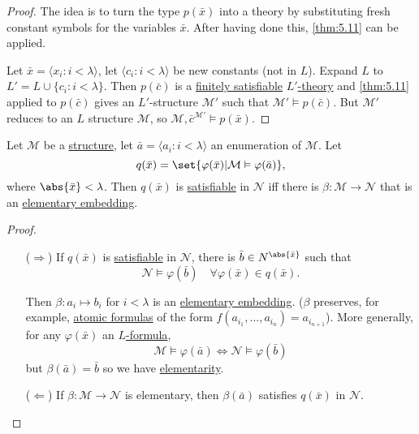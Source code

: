\documentclass{article}
\let\models\vDash
\begin{document}
\begin{proof}
  The idea is to turn the type $p(\bar{x})$ into a theory by substituting fresh constant symbols for the variables $\bar{x}$. After having done this, \cref{thm:5.11} can be applied.
  
  Let $\bar{x} = \langle x_i : i < \lambda \rangle$, let $\langle c_i : i < \lambda \rangle$ be new constants (not in $L$).
  Expand $L$ to $L' = L \cup \{c_i : i < \lambda\}$.
  Then $p(\bar{c})$ is a \hyperlink{def:fs}{finitely satisfiable} \hyperlink{def:ltheory}{$L'$-theory} and \cref{thm:5.11} applied to $p(\bar{c})$ gives an $L'$-structure $\mathcal{M}'$ such that $\mathcal{M}' \models p(\bar{c})$.
  But $\mathcal{M}'$ reduces to an $L$ structure $\mathcal{M}$, so $\mathcal{M}, \bar{c}^{\mathcal{M}'} \models p(\bar{x})$.
\end{proof}
\begin{nlemma}\label{lem:5.14}
  Let $\mathcal{M}$ be a \hyperlink{def:str}{structure}, let $\bar{a} = \langle a_i : i < \lambda \rangle$ an enumeration of $\mathcal{M}$.
  Let
  \begin{equation*}q(\bar{x}) = \set{\varphi(\bar{x}) | \mathcal{M} \models \varphi(\bar{a})},\end{equation*}
  where $\abs{\bar{x}} < \lambda$.
  Then $q(\bar{x})$ is \hyperlink{def:type}{satisfiable} in $\mathcal{N}$ iff there is $\beta: \mathcal{M} \to \mathcal{N}$ that is an \hyperlink{def:el}{elementary embedding}.
\end{nlemma}
\begin{proof}\leavevmode
  \begin{itemize}
    \item[($\Rightarrow$)] If $q(\bar{x})$ is \hyperlink{def:type}{satisfiable} in $\mathcal{N}$, there is $\bar{b} \in N^{\abs{\bar{x}}}$ such that
  \begin{equation*}
    \mathcal{N} \models \varphi(\bar{b}) \quad \forall \varphi(\bar{x}) \in q(\bar{x}).
  \end{equation*}

  Then $\beta: a_i \mapsto b_i$ for $i < \lambda$ is an \hyperlink{def:el}{elementary embedding}.
  ($\beta$ preserves, for example, \hyperlink{def:atomform}{atomic formulas} of the form $f(a_{i_1}, \dotsc, a_{i_n}) = a_{i_{n+1}}$).
  More generally, for any $\varphi(\bar{x})$ an \hyperlink{def:form}{$L$-formula},
  \begin{equation*}
    \mathcal{M} \models \varphi(\bar{a}) \iff \mathcal{N} \models \varphi(\bar{b})
  \end{equation*}
  but $\beta(\bar{a}) = \bar{b}$ so we have \hyperlink{def:el}{elementarity}.

  \item[($\Leftarrow$)] If $\beta: \mathcal{M} \to \mathcal{N}$ is elementary, then $\beta(\bar{a})$ satisfies $q(\bar{x})$ in $\mathcal{N}$. \qedhere
  \end{itemize}
\end{proof}
\end{document}

